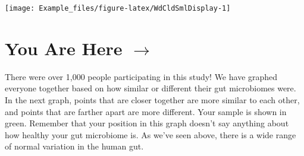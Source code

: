 \documentclass[
  twocolumn]{article}
\begin{document}
\newpage


\begin{strip}
\end{strip}
\vspace{10cm}

\newpage

\begin{center}\texttt{[image: Example\_files/figure-latex/WdCldSmlDisplay-1]} \end{center}

\section{You Are Here $\boldsymbol{\rightarrow}$}

\begin{small}
There were over 1,000 people participating in this study! We have 
graphed everyone together based on how similar or different their gut
microbiomes were. In the next graph, points that are closer together
are more similar to each other, and points that are farther apart are
more different. Your sample is shown in green. Remember that your 
position in this graph doesn't say anything about how healthy your
gut microbiome is. As we've seen above, there is a wide range of 
normal variation in the human gut.
\end{small}

\newpage

\end{document}

